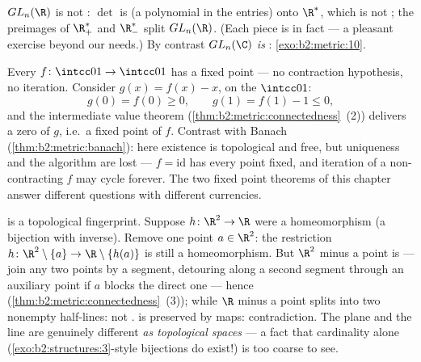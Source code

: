 \begin{example}\label{ex:b2:metric:glnr}
$GL_n(\R)$ is not : $\det$ is  (a polynomial in
the entries) onto $\R^*$, which is not ; the preimages of
$\R_+^*$ and $\R_-^*$ split $GL_n(\R)$. (Each piece is in fact
 --- a pleasant exercise beyond our needs.) By
contrast $GL_n(\C)$ \emph{is} :
\cref{exo:b2:metric:10}.
\end{example}

\begin{example}\label{ex:b2:metric:ivtfixed}
Every  $f \colon \intcc01 \to \intcc01$ has a fixed
point --- no contraction hypothesis, no iteration. Consider
$g(x) = f(x) - x$,  on the  $\intcc01$:
\[
g(0) = f(0) \geq 0,
\qquad
g(1) = f(1) - 1 \leq 0 ,
\]
and the intermediate value theorem
(\cref{thm:b2:metric:connectedness}~(2)) delivers a zero of
$g$, i.e.\ a fixed point of $f$. Contrast with Banach
(\cref{thm:b2:metric:banach}): here existence is topological
and free, but uniqueness and the algorithm are lost --- $f =
\mathrm{id}$ has every point fixed, and iteration of a
non-contracting $f$ may cycle forever. The two fixed point
theorems of this chapter answer different questions with
different currencies.
\end{example}

\begin{example}\label{ex:b2:metric:rnotr2}
 is a topological fingerprint. Suppose $h \colon
\R^2 \to \R$ were a homeomorphism (a  bijection with
 inverse). Remove one point $a \in \R^2$: the
restriction $h \colon \R^2\setminus\{a\} \to
\R\setminus\{h(a)\}$ is still a homeomorphism. But $\R^2$ minus
a point is  --- join any two points by a segment,
detouring along a second segment through an auxiliary point if
$a$ blocks the direct one --- hence 
(\cref{thm:b2:metric:connectedness}~(3)); while $\R$ minus a
point splits into two nonempty  half-lines: not .
 is preserved by  maps: contradiction.
The plane and the line are genuinely different \emph{as
topological spaces} --- a fact that cardinality alone
(\cref{exo:b2:structures:3}-style bijections do exist!) is too
coarse to see.
\end{example}

